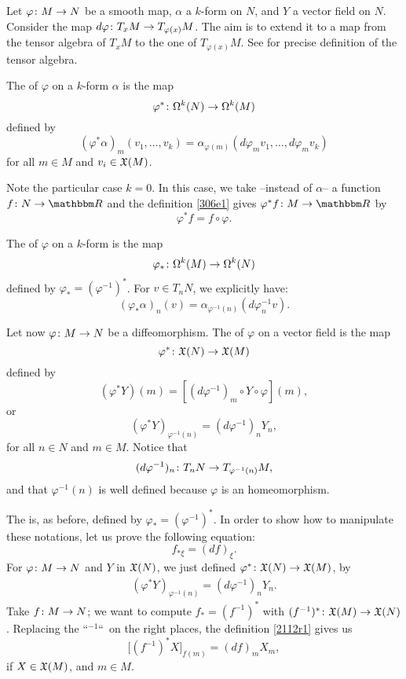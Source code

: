Let $\varphi\colon M\to N$ be a smooth map, $\alpha$ a $k$-form on $N$,
and $Y$ a vector field on $N$. Consider the map $d\varphi\colon T_xM\to T_{\varphi(x)}M$. The aim is to extend it to a map from the tensor algebra of ${T_xM}$ to the one of $T_{\varphi(x)}M$. See \cite{kobayashi} for precise definition of the tensor algebra.

The  of $\varphi$ on a $k$-form $\alpha$ is the map
\[
 \varphi^*\colon \Omega^k(N)\to \Omega^k(M)
\]
 defined by
\begin{equation}\label{306e1}
 (\varphi^*\alpha)_m(v_1,\ldots,v_k)
 =\alpha_{\varphi(m)}(d\varphi_mv_1,\ldots,d\varphi_mv_k)
\end{equation}
for all $m\in M$ and $v_i\in\mathfrak{X}(M)$.

Note the particular case $k=0$. In this case, we take --instead of $\alpha$-- a function $\dpt{f}{N}{\eR}$ and the definition \eqref{306e1} gives $\dpt{\varphi^*f}{M}{\eR}$ by
\[
     \varphi^*f=f\circ\varphi.
\]

The  of $\varphi$ on a $k$-form is the map
\[
 \varphi_*\colon \Omega^k(M)\to \Omega^k(N)
\]
defined by $\varphi_*=(\varphi^{-1})^*$. For $v\in T_nN$, we explicitly have:
\[
                   (\varphi_*\alpha)_n(v)=\alpha_{\varphi^{-1}(n)}(d\varphi_n^{-1} v).
\]

Let now $\varphi\colon M\to N$ be a diffeomorphism. The  of $\varphi$ on a vector field is the map
\[
           \varphi^*\colon \mathfrak{X}(N)\to \mathfrak{X}(M)
\]
defined by
\[
              (\varphi^*Y)(m)=[(d\varphi^{-1})_m\circ Y\circ\varphi](m),
\]
or
\[
 (\varphi^*Y)_{\varphi^{-1}(n)}=(d\varphi^{-1})_nY_n,
\]
for all $n\in N$ and $m\in M$. Notice that \[(d\varphi^{-1})_n\colon T_nN\to T_{\varphi^{-1}(n)}M,\] and that  $\varphi^{-1}(n)$ is well defined because $\varphi$ is an homeomorphism.

The  is, as before, defined by $\varphi_*=(\varphi^{-1})^*$. In order to show how to manipulate these notations, let us prove the following equation:
\[ 
   f_{*\xi}=(df)_{\xi}.
\]
For $\varphi\colon M\to N$ and $Y$ in $\mathfrak{X}(N)$, we just defined $\varphi^*\colon \mathfrak{X}(N)\to \mathfrak{X}(M)$, by
\begin{eqnarray}
 \label{2112r1}(\varphi^*Y)_{\varphi^{-1}(n)}=(d\varphi^{-1})_nY_n.
\end{eqnarray}
Take $f\colon M\to N$; we want to compute $f_*=(f^{-1})^*$ with $(f^{-1})^*\colon \mathfrak{X}(M)\to \mathfrak{X}(N)$. Replacing the ``$^{-1}$``\ on the right places, the definition \eqref{2112r1} gives us
\[
 \Big[(f^{-1})^*X\Big]_{f(m)}=(df)_mX_m,
\]
if $X\in\mathfrak{X}(M)$, and $m\in M$.

